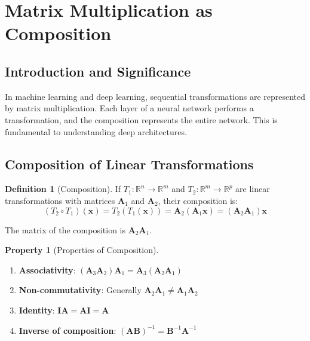 \documentclass[12pt,a4paper]{article}
\theoremstyle{definition}
\newtheorem{definition}{Definition}[section]
\newtheorem{property}{Property}[section]
\begin{document}
\newpage

\section{Matrix Multiplication as Composition}

\subsection{Introduction and Significance}

\begin{tcolorbox}[enhanced,breakable,colback=defcolor,colframe=red!75!black,title=Composition in ML/DL]
In machine learning and deep learning, sequential transformations are represented by matrix multiplication. Each layer of a neural network performs a transformation, and the composition represents the entire network. This is fundamental to understanding deep architectures.
\end{tcolorbox}

\subsection{Composition of Linear Transformations}

\begin{definition}[Composition]
If $T_1: \mathbb{R}^n \rightarrow \mathbb{R}^m$ and $T_2: \mathbb{R}^m \rightarrow \mathbb{R}^p$ are linear transformations with matrices $\mathbf{A}_1$ and $\mathbf{A}_2$, their composition is:
\[
(T_2 \circ T_1)(\mathbf{x}) = T_2(T_1(\mathbf{x})) = \mathbf{A}_2(\mathbf{A}_1\mathbf{x}) = (\mathbf{A}_2\mathbf{A}_1)\mathbf{x}
\]

The matrix of the composition is $\mathbf{A}_2\mathbf{A}_1$.
\end{definition}

\begin{property}[Properties of Composition]
\begin{enumerate}
\item \textbf{Associativity}: $(\mathbf{A}_3\mathbf{A}_2)\mathbf{A}_1 = \mathbf{A}_3(\mathbf{A}_2\mathbf{A}_1)$
\item \textbf{Non-commutativity}: Generally $\mathbf{A}_2\mathbf{A}_1 \neq \mathbf{A}_1\mathbf{A}_2$
\item \textbf{Identity}: $\mathbf{IA} = \mathbf{AI} = \mathbf{A}$
\item \textbf{Inverse of composition}: $(\mathbf{AB})^{-1} = \mathbf{B}^{-1}\mathbf{A}^{-1}$
\end{enumerate}
\end{property}
\end{document}
